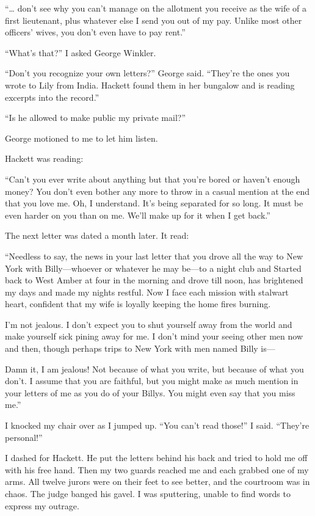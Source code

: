 \documentclass{novel}
\begin{document}
{“… don’t see why you can’t manage on the allotment you receive as the wife of a first lieutenant, plus whatever else I send you out of my pay. Unlike most other officers’ wives, you don’t even have to pay rent.”

“What’s that?” I asked George Winkler.

“Don’t you recognize your own letters?” George said. “They’re the ones you wrote to Lily from India. Hackett found them in her bungalow and is reading excerpts into the record.”

“Is he allowed to make public my private mail?”

George motioned to me to let him listen.

Hackett was reading:

“Can’t you ever write about anything but that you’re bored or haven’t enough money? You don’t even bother any more to throw in a casual mention at the end that you love me. Oh, I understand. It’s being separated for so long. It must be even harder on you than on me. We’ll make up for it when I get back.”

The next letter was dated a month later. It read:

“Needless to say, the news in your last letter that you drove all the way to New York with Billy—whoever or whatever he may be—to a night club and Started back to West Amber at four in the morning and drove till noon, has brightened my days and made my nights restful. Now I face each mission with stalwart heart, confident that my wife is loyally keeping the home fires burning.

I’m not jealous. I don’t expect you to shut yourself away from the world and make yourself sick pining away for me. I don’t mind your seeing other men now and then, though perhaps trips to New York with men named Billy is—

Damn it, I am jealous! Not because of what you write, but because of what you don’t. I assume that you are faithful, but you might make as much mention in your letters of me as you do of your Billys. You might even say that you miss me.”

I knocked my chair over as I jumped up. “You can’t read those!” I said. “They’re personal!”

I dashed for Hackett. He put the letters behind his back and tried to hold me off with his free hand. Then my two guards reached me and each grabbed one of my arms. All twelve jurors were on their feet to see better, and the courtroom was in chaos. The judge banged his gavel. I was sputtering, unable to find words to express my outrage.

}
\end{document}
